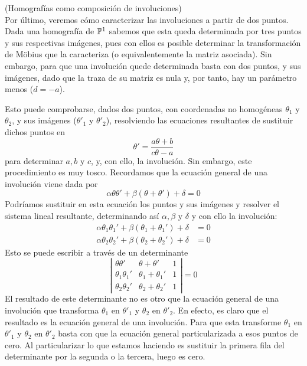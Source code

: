 (Homografías como composición de involuciones)\\

Por último, veremos cómo caracterizar las involuciones a partir de dos puntos.\\

Dada una homografía de $\mathbb{P}^1$ sabemos que esta queda determinada por tres puntos y sus respectivas imágenes, pues con ellos es posible determinar la transformación de Möbius que la caracteriza (o equivalentemente la matriz asociada). Sin embargo, para que una involución quede determinada basta con dos puntos, y sus imágenes, dado que la traza de su matriz es nula y, por tanto, hay un parámetro menos ($d=-a$).

Esto puede comprobarse, dados dos puntos, con coordenadas no homogéneas $\theta_1$ y $\theta_2$, y sus imágenes ($\theta'_1$ y $\theta'_2$), resolviendo las ecuaciones resultantes de sustituir dichos puntos en 
\begin{equation}
	\label{C6:eq_moebius_haces_ec2}
	\theta'=\frac{a\theta+b}{c\theta -a}
\end{equation}
para determinar $a,b$ y $c$, y, con ello, la involución. Sin embargo, este procedimiento es muy tosco. Recordamos que la ecuación general de una involución viene dada por 
\begin{equation*}
	\alpha\theta\theta'+\beta(\theta+\theta')+\delta=0
\end{equation*}
Podríamos sustituir en esta ecuación los puntos y sus imágenes y resolver el sistema lineal resultante, determinando así $\alpha,\beta$ y $\delta$ y con ello la involución:
\begin{equation*}
	\begin{split}
		\alpha\theta_1\theta_1'+\beta(\theta_1+\theta_1')+\delta&=0\\
		\alpha\theta_2\theta_2'+\beta(\theta_2+\theta_2')+\delta&=0
	\end{split}
\end{equation*}
Esto se puede escribir a través de un determinante
\begin{equation}
	\left| \begin{array}{ccc}
		\theta\theta'&\theta+\theta'&1\\
		\theta_1\theta_1'&\theta_1+\theta_1'&1\\
		\theta_2\theta_2'&\theta_2+\theta_2'&1
	\end{array}\right| =0
\end{equation}
El resultado de este determinante no es otro que la ecuación general de una involución que transforma $\theta_1$ en $\theta'_1$ y $\theta_2$ en $\theta'_2$. En efecto, es claro que el resultado es la ecuación general de una involución. Para que esta transforme $\theta_1$ en $\theta'_1$ y $\theta_2$ en $\theta'_2$ basta con que la ecuación general particularizada a esos puntos de cero. Al particularizar lo que estamos haciendo es sustituir la primera fila del determinante por la segunda o la tercera, luego es cero.

